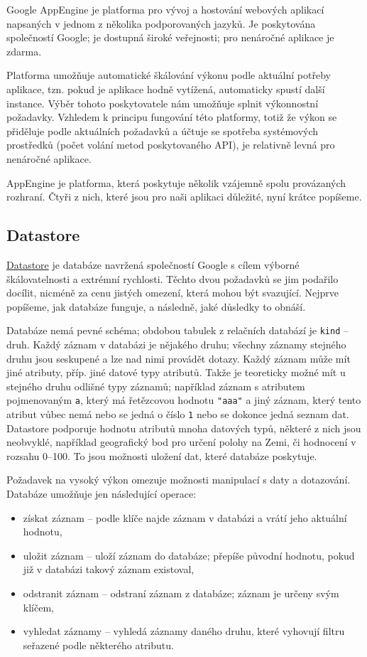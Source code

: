 Google AppEngine je platforma pro vývoj a hostování webových aplikací napsaných v jednom z několika podporovaných jazyků.
Je poskytována společností Google; je dostupná široké veřejnosti; pro nenáročné aplikace je zdarma.

Platforma umožňuje automatické škálování výkonu podle aktuální potřeby aplikace, tzn. pokud je aplikace hodně vytížená, automaticky spustí další instance.
Výběr tohoto poskytovatele nám umožňuje splnit výkonnostní požadavky.
Vzhledem k principu fungování této platformy, totiž že výkon se přiděluje podle aktuálních požadavků a účtuje se spotřeba systémových prostředků (počet volání metod poskytovaného API), je relativně levná pro nenáročné aplikace.

AppEngine je platforma, která poskytuje několik vzájemně spolu provázaných rozhraní.
Čtyři z nich, které jsou pro naši aplikaci důležité, nyní krátce popíšeme.

\subsection{Datastore}
\href{https://developers.google.com/appengine/docs/java/datastore/}{Datastore} je databáze navržená společností Google s cílem výborné škálovatelnosti a extrémní rychlosti.
Těchto dvou požadavků se jim podařilo docílit, nicméně za cenu jistých omezení, která mohou být svazující.
Nejprve popíšeme, jak databáze funguje, a následně, jaké důsledky to obnáší.

Databáze nemá pevné schéma; obdobou tabulek z relačních databází je \verb|kind| -- druh.
Každý záznam v databázi je nějakého druhu; všechny záznamy stejného druhu jsou seskupené a lze nad nimi provádět dotazy.
Každý záznam může mít jiné atributy, příp. jiné datové typy atributů.
Takže je teoreticky možné mít u stejného druhu odlišné typy záznamů; například záznam s atributem pojmenovaným \verb|a|, který má řetězcovou hodnotu \verb|"aaa"| a jiný záznam, který tento atribut vůbec nemá nebo se jedná o číslo \verb|1| nebo se dokonce jedná seznam dat.
Datastore podporuje hodnotu atributů mnoha datových typů, některé z nich jsou neobvyklé, například geografický bod pro určení polohy na Zemi, či hodnocení v rozsahu 0--100.
To jsou možnosti uložení dat, které databáze poskytuje.

Požadavek na vysoký výkon omezuje možnosti manipulací s daty a dotazování.
Databáze umožňuje jen následující operace:
\begin{itemize}
	\item získat záznam -- podle klíče najde záznam v databázi a vrátí jeho aktuální hodnotu,
	\item uložit záznam -- uloží záznam do databáze; přepíše původní hodnotu, pokud již v databázi takový záznam existoval,
	\item odstranit záznam -- odstraní záznam z databáze; záznam je určeny svým klíčem,
	\item vyhledat záznamy -- vyhledá záznamy daného druhu, které vyhovují filtru seřazené podle některého atributu.
\end{itemize}

